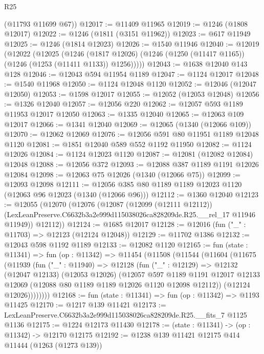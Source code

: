 \begin{lexlean}{R25}
\begin{coremodule}
      (@11793 @11699 @67))
@12017 := @11409 @11965
@12019 := @1246 (@1808 @12017)
@12022 := @1246 (@1811 (@3151 @11962))
@12023 := @617 @11949
@12025 := @1246 (@1814 @12023)
@12026 := @1540 @11946
@12040 := @12019
    (@12022
      (@12025
        (@1246 (@1817 @12026) (@1246 (@1250 (@11417 @1165)) (@1246 (@1253 (@11411 @1133)) @1256)))))
@12043 := @1638 @12040 @143 @128
@12046 := @12043 @594 @11954 @1189
@12047 := @1124 @12017
@12048 := @1540 @11968
@12050 := @1124 @12048 @1120
@12052 := @12046 (@12047 @12050)
@12053 := @1598 @12017
@12055 := @12052 (@12053 @12048)
@12056 := @1326 @12040
@12057 := @12056 @220
@12062 := @12057 @593 @1189 @11953 @12017 @12050
@12063 := @1335 @12040
@12065 := @12063 @109 @12017
@12066 := @1341 @12040
@12069 := @12065 (@1340 (@12066 @109))
@12070 := @12062 @12069
@12076 := @12056 @591 @80 @11951 @1189 @12048 @1120
@12081 := @1851 @12040 @589 @552 @1192 @11950
@12082 := @1124 @12026
@12084 := @1124 @12023 @1120
@12087 := @12081 (@12082 @12084) @12048
@12088 := @12056 @372
@12093 := @12088 @387 @1189 @1191 @12026 @12084
@12098 := @12063 @75 @12026 (@1340 (@12066 @75))
@12099 := @12093 @12098
@12111 := @12056 @385 @80 @1189 @1189 @12023 @1120 (@12063 @96 @12023 (@1340 (@12066 @96)))
@12112 := @1360 @12040
@12123 := @12055
    (@12070
      (@12076
        (@12087
          (@12099 (@12111 @12112))
          (LexLeanPreserve.C6632b3a2e999d115038026ca828209de.R25.__rel_17 @11946 @11949))
        @12112))
@12124 := @1685 @12017
@12128 := @12016 (fun ("_" : @11703) => @12123 (@12124 @12048))
@12129 := @11702 @1386
@12132 := @12043 @598 @1192 @1189
@12133 := @12082 @1120
@12165 := fun (state : @11341) =>
  fun (op : @11342) =>
  @11454
    (@11508
      (@11544
        (@11604
          (@11675
            (@11939
              (fun ("_" : @11940) =>
              @12128
                (fun ("_" : @12129) =>
                @12132
                  (@12047 @12133)
                  (@12053 @12026)
                  (@12057
                    @597
                    @1189
                    @1191
                    @12017
                    @12133
                    @12069
                    (@12088 @80 @1189 @1189 @12026 @1120 @12098 @12112))
                  (@12124 @12026))))))))
@12168 := fun (state : @11341) => fun (op : @11342) => @1193 @11425
@12170 := @1217 @139 @11421
@12173 := LexLeanPreserve.C6632b3a2e999d115038026ca828209de.R25.__fits_7 @1125 @1136
@12175 := @1224 @12173 @11430
@12178 := (state : @11341) -> (op : @11342) -> @12170 @12175
@12192 := @1238
    @139
    @11421
    @12175
    @414
    @11444
    (@1263 (@1273 @139))

\end{coremodule}
\end{lexlean}
